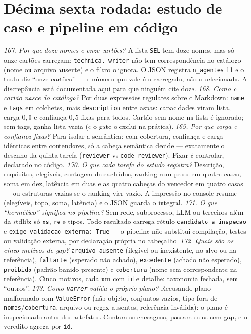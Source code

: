 \section{Décima sexta rodada: estudo de caso e pipeline em código}
\textit{167. Por que doze nomes e onze cartões?} A lista \texttt{SEL} tem doze nomes, mas só onze cartões carregam: \texttt{technical-writer} não tem correspondência no catálogo (nome ou arquivo ausente) e o filtro o ignora. O JSON registra \texttt{n\_agentes} 11 e o texto diz ``onze cartões'' --- o número que vale é o carregado, não o selecionado. A discrepância está documentada aqui para que ninguém cite doze.
\textit{168. Como o cartão nasce do catálogo?} Por duas expressões regulares sobre o Markdown: \texttt{name} e \texttt{tags} em colchetes, mais \texttt{description} entre aspas; capacidades viram lista, carga $0{,}0$ e confiança $0{,}5$ fixas para todos. Cartão sem nome na lista é ignorado; sem tags, ganha lista vazia (e o gate o exclui na prática).
\textit{169. Por que carga e confiança fixas?} Para isolar a semântica: com cobertura, confiança e carga idênticas entre contendores, só a cabeça semântica decide --- exatamente o desenho da quinta tarefa (\texttt{reviewer} vs \texttt{code-reviewer}). Fixar é controlar, declarado no código.
\textit{170. O que cada tarefa do estudo registra?} Descrição, requisitos, elegíveis, contagem de excluídos, ranking com pesos em quatro casas, soma em dez, latência em duas e as quatro cabeças do vencedor em quatro casas --- ou estruturas vazias se o ranking vier vazio. A impressão no console resume (elegíveis, topo, soma, latência) e o JSON guarda o integral.
\textit{171. O que ``hermético'' significa no pipeline?} Sem rede, subprocesso, LLM ou terceiros além da stdlib: só \texttt{os}, \texttt{re} e tipos. Todo resultado carrega rótulo \texttt{candidato\_a\_inspecao} e \texttt{exige\_validacao\_externa: True} --- o pipeline não substitui compilação, testes ou validação externa, por declaração própria no cabeçalho.
\textit{172. Quais são os cinco motivos de gap?} \texttt{arquivo\_ausente} (ilegível ou inexistente, no alvo ou na referência), \texttt{faltante} (esperado não achado), \texttt{excedente} (achado não esperado), \texttt{proibido} (padrão banido presente) e \texttt{cobertura} (nome sem correspondente na referência). Cinco motivos, cada um com \texttt{id} e detalhe: taxonomia fechada, sem ``outros''.
\textit{173. Como \texttt{varrer} valida o próprio plano?} Recusando plano malformado com \texttt{ValueError} (não-objeto, conjuntos vazios, tipo fora de \texttt{nomes}/\texttt{cobertura}, arquivo ou regex ausentes, referência inválida): o plano é inspecionado antes dos artefatos. Contam-se checagens, passam-se as sem gap, e o veredito agrega por \texttt{id}.
